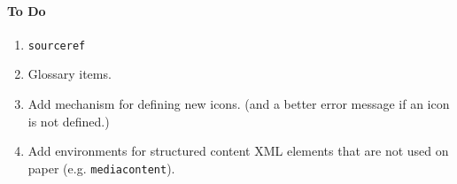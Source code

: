 \documentclass[solutionsatend]{ouunit}
\begin{document}
\paragraph{To Do}
\begin{enumerate}
\item
\verb”sourceref”
\item
Glossary items.
\item
Add mechanism for defining new icons. (and a better error message if an icon is not defined.)
\item
Add environments for structured content XML elements that are not used on paper (e.g. 
\verb"mediacontent").
\end{enumerate}

\printexercisesolutions
\printactivitysolutions
\printindex
 
\end{document}
